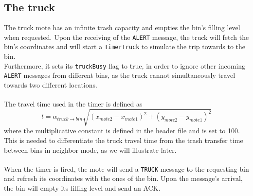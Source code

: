 \documentclass[a4paper,10pt]{article}
\begin{document}
\subsection{The truck}
The truck mote has an infinite trash capacity and empties the bin's filling level when requested. Upon the receiving of the \texttt{ALERT} message, the truck will fetch the bin's coordinates and will start a \texttt{TimerTruck} to simulate the trip towards to the bin. \\ Furthermore, it sets its \texttt{truckBusy} flag to true, in order to ignore other incoming \texttt{ALERT} messages from different bins, as the truck cannot simultaneously travel towards two different locations. \\ \\
The travel time used in the timer is defined as
\begin{equation} \label{xd}
	t=\alpha_{truck\rightarrow bin}\sqrt{\left(x_{mote2} - x_{mote1}\right)^2 + \left(y_{mote2} - y_{mote1}\right)^2}
\end{equation}
where the multiplicative constant is defined in the header file and is set to 100.  This is needed to differentiate the truck travel time from the trash transfer time between bins in neighbor mode, as we will illustrate later. \\\\
When the timer is fired, the mote will send a \texttt{TRUCK} message to the requesting bin and refresh its coordinates with the ones of the bin. Upon the message's arrival, the bin will empty its filling level and send an ACK.
\end{document}
